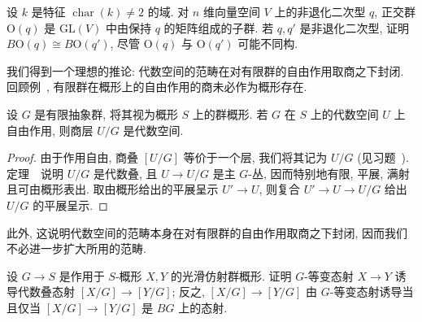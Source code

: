 \begin{exercise}[$B\mathrm O(q)$]\label{src:4.1.13}
设 $k$ 是特征 $\operatorname{char}(k)\neq2$ 的域. 对 $n$ 维向量空间 $V$ 上的非退化二次型 $q$, 正交群 $\mathrm O(q)$ 是 $\mathrm{GL}(V)$ 中由保持 $q$ 的矩阵组成的子群. 若 $q,q'$ 是非退化二次型, 证明 $B\mathrm O(q)\cong B\mathrm O(q')$, 尽管 $\mathrm O(q)$ 与 $\mathrm O(q')$ 可能不同构.
\end{exercise}
我们得到一个理想的推论: 代数空间的范畴在对有限群的自由作用取商之下封闭. 回顾例~, 有限群在概形上的自由作用的商未必作为概形存在.
\begin{corollary}\label{src:4.1.14}
设 $G$ 是有限抽象群, 将其视为概形 $S$ 上的群概形. 若 $G$ 在 $S$ 上的代数空间 $U$ 上自由作用, 则商层 $U/G$ 是代数空间.
\end{corollary}
\begin{proof}
由于作用自由, 商叠 $[U/G]$ 等价于一个层, 我们将其记为 $U/G$ (见习题~). 定理~~说明 $U/G$ 是代数叠, 且 $U\to U/G$ 是主 $G$-丛, 因而特别地有限, 平展, 满射且可由概形表出. 取由概形给出的平展呈示 $U'\to U$, 则复合 $U'\to U\to U/G$ 给出 $U/G$ 的平展呈示.
\end{proof}
\begin{remark}\label{src:4.1.15}
此外, 这说明代数空间的范畴本身在对有限群的自由作用取商之下封闭, 因而我们不必进一步扩大所用的范畴.
\end{remark}
\begin{exercise}[简单]\label{src:4.1.16}
设 $G\to S$ 是作用于 $S$-概形 $X,Y$ 的光滑仿射群概形. 证明 $G$-等变态射 $X\to Y$ 诱导代数叠态射 $[X/G]\to[Y/G]$; 反之, $[X/G]\to[Y/G]$ 由 $G$-等变态射诱导当且仅当 $[X/G]\to[Y/G]$ 是 $BG$ 上的态射.
\end{exercise}

